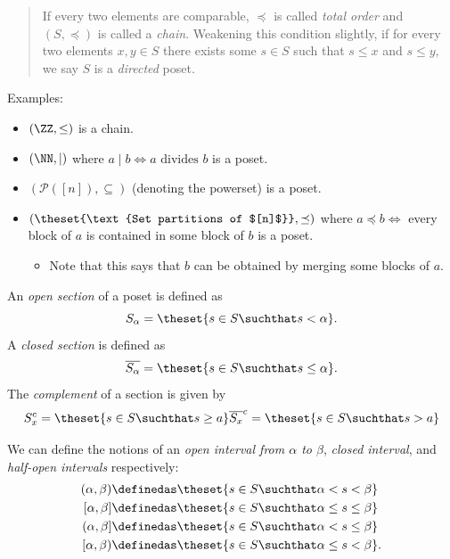 \begin{quote}
If every two elements are comparable, \(\preceq\) is called \emph{total
order} and \((S, \preceq)\) is called a \emph{chain}. Weakening this
condition slightly, if for every two elements \(x,y\in S\) there exists
some \(s\in S\) such that \(s\leq x\) and \(s \leq y\), we say \(S\) is
a \emph{directed} poset.
\end{quote}

Examples:

\begin{itemize}
\tightlist
\item
  \((\ZZ, \leq)\) is a chain.
\item
  \((\NN, \mid)\) where \(a\mid b \iff a\text{ divides } b\) is a poset.
\item
  \((\mathcal{P}([n]), \subseteq)\) (denoting the powerset) is a poset.
\item
  \((\theset{\text{Set partitions of $[n]$}}, \preceq)\) where
  \(a \preceq b \iff\) every block of \(a\) is contained in some block
  of \(b\) is a poset.

  \begin{itemize}
  \tightlist
  \item
    Note that this says that \(b\) can be obtained by merging some
    blocks of \(a\).
  \end{itemize}
\end{itemize}

An \emph{open section} of a poset is defined as
\[S_\alpha = \theset{s \in S \suchthat s < \alpha}.\] A \emph{closed
section} is defined as
\[\overline{S_\alpha} = \theset{s \in S \suchthat s \leq \alpha}.\] The
\emph{complement} of a section is given by \[
S_x^c = \theset{s\in S \suchthat s \geq a} \\
\overline{S_x}^c = \theset{s\in S \suchthat s > a}
\]

We can define the notions of an \emph{open interval from \(\alpha\) to
\(\beta\)}, \emph{closed interval}, and \emph{half-open intervals}
respectively: \[
\begin{aligned}
(\alpha, \beta) &\definedas \theset{s\in S \suchthat \alpha < s < \beta}\\
[\alpha, \beta] &\definedas \theset{s\in S \suchthat \alpha \leq s \leq \beta}\\
(\alpha, \beta] &\definedas \theset{s\in S \suchthat \alpha < s \leq \beta}\\
[\alpha, \beta) &\definedas \theset{s\in S \suchthat \alpha \leq s < \beta}.
\end{aligned}
\]

